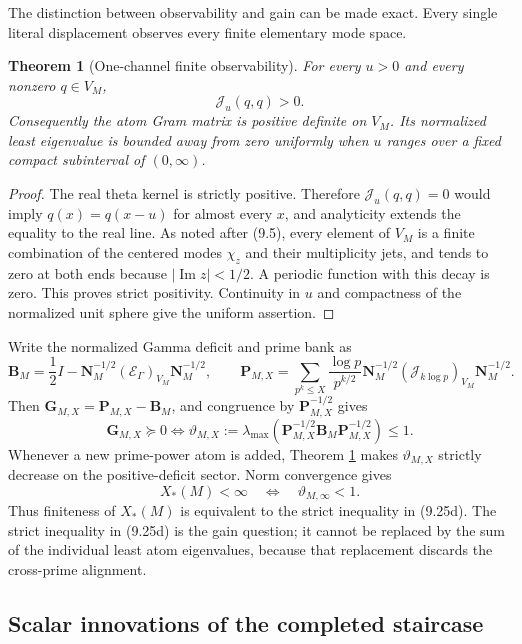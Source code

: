 \documentclass[11pt]{amsart}
\newtheorem{theorem}{Theorem}[section]
\theoremstyle{definition}
\theoremstyle{remark}
\begin{document}
The distinction between observability and gain can be made exact.  Every
single literal displacement observes every finite elementary mode space.

\begin{theorem}[One-channel finite observability]
\label{thm:one-channel-observability}
For every \(u>0\) and every nonzero \(q\in V_M\),
\[
 \boxed{\mathcal J_u(q,q)>0.}
\tag{9.25a}
\]
Consequently the atom Gram matrix is positive definite on \(V_M\).  Its
normalized least eigenvalue is bounded away from zero uniformly when
\(u\) ranges over a fixed compact subinterval of \((0,\infty)\).
\end{theorem}

\begin{proof}
The real theta kernel is strictly positive.  Therefore
\(\mathcal J_u(q,q)=0\) would imply
\(q(x)=q(x-u)\) for almost every \(x\), and analyticity extends the equality
to the real line.  As noted after (9.5), every element of \(V_M\) is a
finite combination of the centered modes \(\chi_z\) and their
multiplicity jets, and tends to zero at both ends because
\(\lvert\operatorname {Im}z\rvert<1/2\).  A periodic function with this
decay is zero.  This proves strict positivity.  Continuity in \(u\) and
compactness of the normalized unit sphere give the uniform assertion.
\end{proof}

Write the normalized Gamma deficit and prime bank as
\[
 \mathbf B_M=\frac12I-
 \mathbf N_M^{-1/2}(\mathscr E_\Gamma)_{V_M}\mathbf N_M^{-1/2},
 \qquad
 \mathbf P_{M,X}=\sum_{p^k\le X}\frac{\log p}{p^{k/2}}
 \mathbf N_M^{-1/2}(\mathcal J_{k\log p})_{V_M}\mathbf N_M^{-1/2}.
\tag{9.25b}
\]
Then \(\mathbf G_{M,X}=\mathbf P_{M,X}-\mathbf B_M\), and congruence by
\(\mathbf P_{M,X}^{-1/2}\) gives
\[
 \boxed{
 \mathbf G_{M,X}\succeq0
 \Longleftrightarrow
 \vartheta_{M,X}:=
 \lambda_{\max}(\mathbf P_{M,X}^{-1/2}
 \mathbf B_M\mathbf P_{M,X}^{-1/2})\le1.}
\tag{9.25c}
\]
Whenever a new prime-power atom is added, Theorem
\ref{thm:one-channel-observability} makes \(\vartheta_{M,X}\) strictly
decrease on the positive-deficit sector.  Norm convergence gives
\[
 \boxed{X_*(M)<\infty\quad\Longleftrightarrow\quad
 \vartheta_{M,\infty}<1.}
\tag{9.25d}
\]
Thus finiteness of \(X_*(M)\) is equivalent to the strict inequality in
(9.25d).  The strict inequality in (9.25d) is the gain question; it
cannot be replaced by the sum of the individual least atom eigenvalues,
because that replacement discards the cross-prime alignment.

\subsection{Scalar innovations of the completed staircase}
\end{document}
